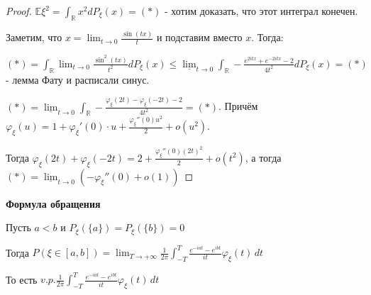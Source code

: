 \begin{proof}
    $\mathbb{E} \xi^2 = \int_{\mathbb{R}} x^2 dP_{\xi} (x) = (*)$ - хотим доказать, что этот интеграл конечен.

    Заметим, что $x = \lim_{t \to 0} \frac{\sin (tx)}{t}$ и подставим вместо $x$. Тогда:

    $(*) = \int_{\mathbb{R}} \lim_{t \to 0} \frac{\sin^2 (tx)}{t^2} dP_{\xi}(x) \leqslant
    \underline{\lim}_{t \to 0} \int_{\mathbb{R}} -\frac{e^{2itx} + e^{-2itx} - 2}{4t^2} dP_{\xi} (x) = (*)$ - лемма Фату и расписали синус.

    $(*) = \underline{\lim}_{t \to 0} \int_{\mathbb{R}} -\frac{\varphi_{\xi}(2t) - \varphi_{\xi}(-2t) - 2}{4t^2} = (*)$. Причём $\varphi_{\xi} (u) = 1 + \varphi_{\xi}'(0) \cdot u + \frac{\varphi_{\xi}''(0) u^2}{2} + o(u^2)$.

    Тогда $\varphi_{\xi}(2t) + \varphi_{\xi}(-2t) = 2 + \frac{\varphi_{\xi}''(0) (2t)^2}{2} + o(t^2)$, а тогда $(*) = \underline{\lim}_{t \to 0} (-\varphi_{\xi}''(0) + o(1))$
\end{proof}

\begin{theorem}
    \textbf{Формула обращения}

    Пусть $a < b$ и $P_{\xi}(\{ a \}) = P_{\xi}(\{  b \}) = 0$

    Тогда $P(\xi \in [a, b]) = \lim_{T \to +\infty} \frac{1}{2\pi} \int_{-T}^{T} \frac{e^{-iat} - e^{ibt}}{it} \varphi_{\xi}(t) \, dt $

    То есть $v.p. \frac{1}{2\pi} \int_{-T}^{T} \frac{e^{-iat} - e^{ibt}}{it} \varphi_{\xi}(t) \, dt$
\end{theorem}

